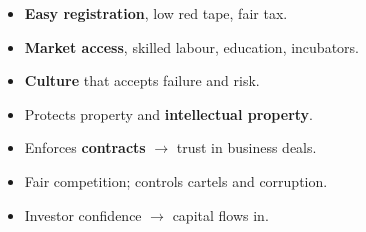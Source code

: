 {\begin{itemize}
  \item \textbf{Easy registration}, low red tape, fair tax.
  \item \textbf{Market access}, skilled labour, education, incubators.
  \item \textbf{Culture} that accepts failure and risk.
\end{itemize}
\begin{itemize}
  \item Protects property and \textbf{intellectual property}.
  \item Enforces \textbf{contracts} $\rightarrow$ trust in business deals.
  \item Fair competition; controls cartels and corruption.
  \item Investor confidence $\rightarrow$ capital flows in.
\end{itemize}}

